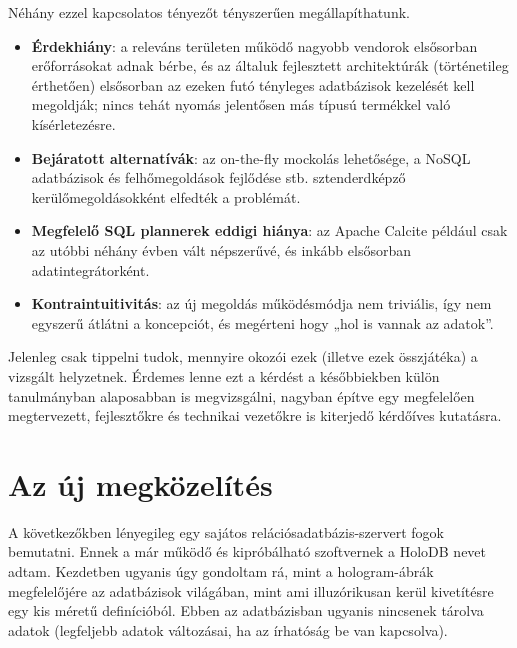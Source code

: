 \documentclass[
    parspace,
    noindent,
    nohyp,
]{elteiktdk}[2023/04/10]
\newcommand{\todoref}[1]{\todo[inline, noinlinepar, color=red, textcolor=white, inlinewidth=0.6cm, caption={#1}]{\large \textbf{×}}}
\begin{document}
Néhány ezzel kapcsolatos tényezőt tényszerűen megállapíthatunk.

\begin{itemize}
    \item \textbf{Érdekhiány}: a releváns területen működő nagyobb vendorok elsősorban
          erőforrásokat adnak bérbe, és az általuk fejlesztett architektúrák (történetileg érthetően)
          elsősorban az ezeken futó tényleges adatbázisok kezelését kell megoldják;
          nincs tehát nyomás jelentősen más típusú termékkel való kísérletezésre.
          \todoref{+CITE: (miért nincs?) erőforrásokat adnak bérbe}
    \item \textbf{Bejáratott alternatívák}: az on-the-fly mockolás lehetősége,
          a NoSQL adatbázisok és felhőmegoldások fejlődése stb.
          sztenderdképző kerülőmegoldásokként elfedték a problémát.
          \todoref{+CITE: (miért nincs?) kerülőmegoldások}
    \item \textbf{Megfelelő SQL plannerek eddigi hiánya}: az Apache Calcite például
          csak az utóbbi néhány évben vált népszerűvé, és inkább elsősorban adatintegrátorként.
          \todoref{+CITE: (miért nincs?) SQL-plannerek csak utóbb}
    \item \textbf{Kontraintuitivitás}: az új megoldás működésmódja nem triviális,
          így nem egyszerű átlátni a koncepciót, és megérteni hogy „hol is vannak az adatok”.
          \todoref{+CITE: (miért nincs?) hol is vannak az adatok}
\end{itemize}

Jelenleg csak tippelni tudok, mennyire okozói ezek (illetve ezek összjátéka) a vizsgált helyzetnek.
Érdemes lenne ezt a kérdést a későbbiekben külön tanulmányban alaposabban is megvizsgálni,
nagyban építve egy megfelelően megtervezett, fejlesztőkre és technikai vezetőkre is kiterjedő kérdőíves kutatásra.

\section{Az új megközelítés}

A következőkben lényegileg egy sajátos relációsadatbázis-szervert fogok bemutatni.
Ennek a már működő és kipróbálható szoftvernek a HoloDB nevet adtam.
Kezdetben ugyanis úgy gondoltam rá,
mint a hologram-ábrák megfelelőjére az adatbázisok világában,
mint ami illuzórikusan kerül kivetítésre egy kis méretű definícióból.
Ebben az adatbázisban ugyanis nincsenek tárolva adatok
(legfeljebb adatok változásai, ha az írhatóság be van kapcsolva).
\end{document}
